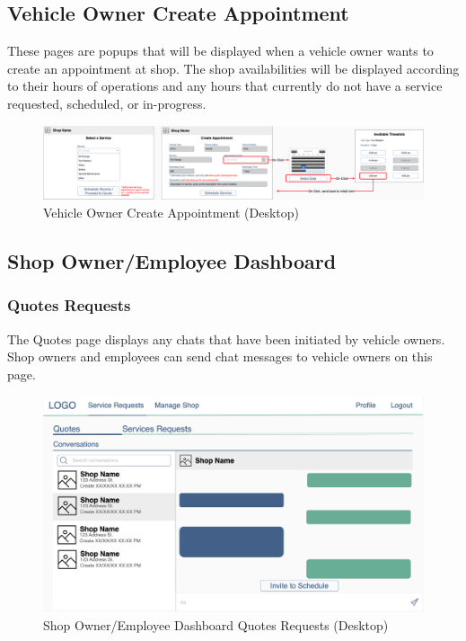 \documentclass[12pt, titlepage]{article}
\begin{document}
\subsection{Vehicle Owner Create Appointment}
These pages are popups that will be displayed when a vehicle owner wants to create an appointment
at shop. The shop availabilities will be displayed according to their hours of operations and any
hours that currently do not have a service requested, scheduled, or in-progress.

\begin{figure}[H]
	\centering
	\includegraphics[width=\textwidth]{mockups/Vehicle Owner - Create Appointment Popup (Desktop).png}
	\caption{Vehicle Owner Create Appointment (Desktop)}
\end{figure}

\subsection{Shop Owner/Employee Dashboard}
\subsubsection{Quotes Requests}
The Quotes page displays any chats that have been initiated by vehicle owners. Shop owners and
employees can send chat messages to vehicle owners on this page.

\begin{figure}[H]
	\centering
	\includegraphics[width=\textwidth]{mockups/Shop Owner Dashboard (Quotes Requests) (Desktop).png}
	\caption{Shop Owner/Employee Dashboard \textemdash{} Quotes Requests (Desktop)}
\end{figure}
\end{document}
